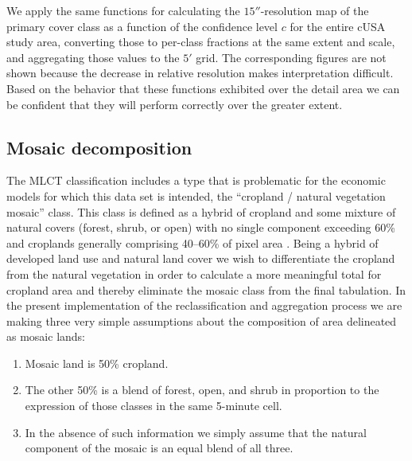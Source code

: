 

We apply the same functions for calculating the $15''$-resolution map
of the primary cover class as a function of the confidence level $c$
for the entire cUSA study area, converting those to per-class
fractions at the same extent and scale, and aggregating those values
to the $5'$ grid.  The corresponding figures are not shown because the
decrease in relative resolution makes interpretation difficult.  Based
on the behavior that these functions exhibited over the detail area we
can be confident that they will perform correctly over the greater
extent.



\subsection{Mosaic decomposition}
\label{sec:decomposition}

The MLCT classification includes a type that is problematic for the
economic models for which this data set is intended, the ``cropland /
natural vegetation mosaic'' class.  This class is defined as a hybrid
of cropland and some mixture of natural covers (forest, shrub, or
open) with no single component exceeding 60\% \citep{Friedl2002} and
croplands generally comprising 40--60\% of pixel area . Being a hybrid of developed land use and natural land cover
we wish to differentiate the cropland from the natural vegetation in
order to calculate a more meaningful total for cropland area and
thereby eliminate the mosaic class from the final tabulation.  In the
present implementation of the reclassification and aggregation process
we are making three very simple assumptions about the composition of
area delineated as mosaic lands:

\begin{enumerate}
\item Mosaic land is 50\% cropland.
\item The other 50\% is a blend of forest, open, and shrub in
  proportion to the expression of those classes in the same 5-minute
  cell.
\item In the absence of such information we simply assume that the
  natural component of the mosaic is an equal blend of all three.
\end{enumerate}

